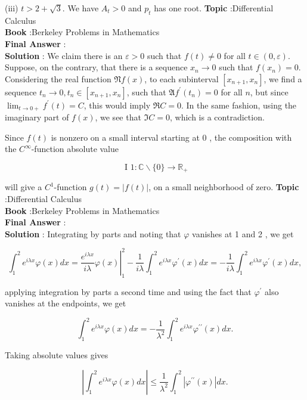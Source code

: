 \documentclass[10pt]{article}
\begin{document}
(iii) $t>2+\sqrt{3}$. We have $A_{t}>0$ and $p_{t}$ has one root.
\textbf{Topic} :Differential Calculus \\
\textbf{Book} :Berkeley Problems in Mathematics\\
\textbf{Final Answer} :\\


\textbf{Solution} : We claim there is an $\varepsilon>0$ such that $f(t) \neq 0$ for all $t \in(0, \varepsilon)$. Suppose, on the contrary, that there is a sequence $x_{n} \rightarrow 0$ such that $f\left(x_{n}\right)=0$. Considering the real function $\mathfrak{N} f(x)$, to each subinterval $\left[x_{n+1}, x_{n}\right]$, we find a sequence $t_{n} \rightarrow 0, t_{n} \in\left[x_{n+1}, x_{n}\right]$, such that $\mathfrak{A} f^{\prime}\left(t_{n}\right)=0$ for all $n$, but since $\lim _{t \rightarrow 0+} f^{\prime}(t)=C$, this would imply $\Re C=0$. In the same fashion, using the imaginary part of $f(x)$, we see that $\Im C=0$, which is a contradiction.

Since $f(t)$ is nonzero on a small interval starting at 0 , the composition with the $C^{\infty}$-function absolute value

$$
\text { I } 1: \mathbb{C} \backslash\{0\} \rightarrow \mathbb{R}_{+}
$$

will give a $C^{1}$-function $g(t)=|f(t)|$, on a small neighborhood of zero.
\textbf{Topic} :Differential Calculus \\
\textbf{Book} :Berkeley Problems in Mathematics\\
\textbf{Final Answer} :\\


\textbf{Solution} : Integrating by parts and noting that $\varphi$ vanishes at 1 and 2 , we get

$$
\int_{1}^{2} e^{i \lambda x} \varphi(x) d x=\left.\frac{e^{i \lambda x}}{i \lambda} \varphi(x)\right|_{1} ^{2}-\frac{1}{i \lambda} \int_{1}^{2} e^{i \lambda x} \varphi^{\prime}(x) d x=-\frac{1}{i \lambda} \int_{1}^{2} e^{i \lambda x} \varphi^{\prime}(x) d x,
$$

applying integration by parts a second time and using the fact that $\varphi^{\prime}$ also vanishes at the endpoints, we get

$$
\int_{1}^{2} e^{i \lambda x} \varphi(x) d x=-\frac{1}{\lambda^{2}} \int_{1}^{2} e^{i \lambda x} \varphi^{\prime \prime}(x) d x .
$$

Taking absolute values gives

$$
\left|\int_{1}^{2} e^{i \lambda x} \varphi(x) d x\right| \leqslant \frac{1}{\lambda^{2}} \int_{1}^{2}\left|\varphi^{\prime \prime}(x)\right| d x .
$$
\end{document}
